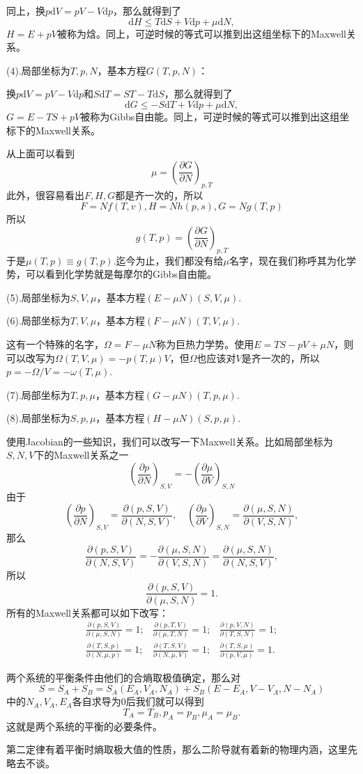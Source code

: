 \documentclass[10pt]{book}
\theoremstyle{plain}%
\begin{document}
同上，换$p\mathrm{d}V=pV-V\mathrm{d}p$，那么就得到了
\[
\mathrm{d}H \leq T\mathrm{d}S+V\mathrm{d}p+\mu \mathrm{d}N,
\]
$H=E+pV$被称为焓。同上，可逆时候的等式可以推到出这组坐标下的Maxwell关系。

{\kaishu (4).局部坐标为$T,p,N$，基本方程$G(T,p,N)$}：

换$p\mathrm{d}V=pV-V\mathrm{d}p$和$S\mathrm{d}T=ST-T\mathrm{d}S$，那么就得到了
\[
\mathrm{d}G \leq -S\mathrm{d}T+V\mathrm{d}p+\mu \mathrm{d}N,
\]
$G=E-TS+pV$被称为Gibbs自由能。同上，可逆时候的等式可以推到出这组坐标下的Maxwell关系。

从上面可以看到
\[
\mu=\left(\frac{\partial G}{\partial N}\right)_{p,T}
\]
此外，很容易看出$F,H,G$都是齐一次的，所以
\[
F=Nf(T,v),H=Nh(p,s),G=Ng(T,p)
\]
所以
\[
g(T,p)=\left(\frac{\partial G}{\partial N}\right)_{p,T}
\]
于是$\mu(T,p)\equiv g(T,p)$.迄今为止，我们都没有给$\mu$名字，现在我们称呼其为化学势，可以看到化学势就是每摩尔的Gibbs自由能。

{\kaishu (5).局部坐标为$S,V,\mu$，基本方程$(E-\mu N)(S,V,\mu)$}.

{\kaishu (6).局部坐标为$T,V,\mu$，基本方程$(F-\mu N)(T,V,\mu)$}.

这有一个特殊的名字，$\Omega=F-\mu N$称为巨热力学势。使用$E=TS-pV+\mu N$，则可以改写为$\Omega(T,V,\mu)=-p(T,\mu)V$，但$\Omega$也应该对$V$是齐一次的，所以$p=-\Omega/V=-\omega(T,\mu)$.

{\kaishu (7).局部坐标为$T,p,\mu$，基本方程$(G-\mu N)(T,p,\mu)$}.

{\kaishu (8).局部坐标为$S,p,\mu$，基本方程$(H-\mu N)(S,p,\mu)$}.

使用Jacobian的一些知识，我们可以改写一下Maxwell关系。比如局部坐标为$S,N,V$下的Maxwell关系之一
\[
\left(\frac{\partial p}{\partial N}\right)_{S,V}=-\left(\frac{\partial \mu}{\partial V}\right)_{S,N}
\]
由于
\[
\left(\frac{\partial p}{\partial N}\right)_{S,V}=\frac{\partial(p,S,V)}{\partial (N,S,V)},\quad\left(\frac{\partial \mu}{\partial V}\right)_{S,N}=\frac{\partial (\mu,S,N)}{\partial(V,S,N)},
\]
那么
\[
\frac{\partial(p,S,V)}{\partial (N,S,V)}=-\frac{\partial (\mu,S,N)}{\partial(V,S,N)}=\frac{\partial (\mu,S,N)}{\partial(N,S,V)},
\]
所以
\[
\frac{\partial(p,S,V)}{\partial (\mu,S,N)}=1.
\]
所有的Maxwell关系都可以如下改写：
\[
\begin{matrix}
\displaystyle{\frac{\partial(p,S,V)}{\partial (\mu,S,N)}=1;}&\displaystyle{\frac{\partial(p,T,V)}{\partial (\mu,T,N)}=1;}&\displaystyle{\frac{\partial(p,V,N)}{\partial (T,S,N)}=1;}\\
\displaystyle{\frac{\partial(T,S,p)}{\partial (N,\mu,p)}=1;}&\displaystyle{\frac{\partial(T,S,V)}{\partial (N,\mu,V)}=1;}&\displaystyle{\frac{\partial(T,S,\mu)}{\partial (p,V,\mu)}=1.}
\end{matrix}
\]

两个系统的平衡条件由他们的合熵取极值确定，那么对
\[
S=S_A+S_B=S_A(E_A,V_A,N_A)+S_B(E-E_A,V-V_A,N-N_A)
\]
中的$N_A,V_A,E_A$各自求导为0后我们就可以得到
\[
T_A=T_B,p_A=p_B,\mu_A=\mu_B.
\]
这就是两个系统的平衡的必要条件。

第二定律有着平衡时熵取极大值的性质，那么二阶导就有着新的物理内涵，这里先略去不谈。
\end{document}
